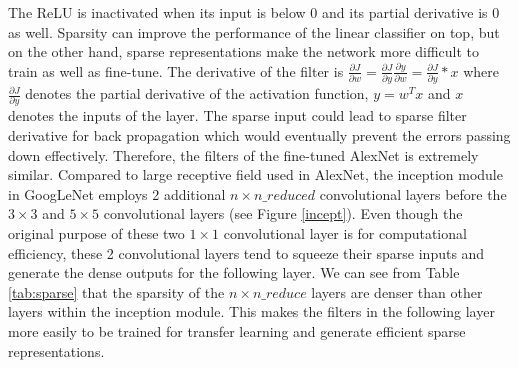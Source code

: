 The ReLU is inactivated when its input is below 0 and its partial derivative is 0 as well. Sparsity can improve the performance of the linear classifier on top, but on the other hand, sparse representations make the network more difficult to train as well as fine-tune. The derivative of the filter is $\frac{{\partial J}}{{\partial w}} = \frac{{\partial J}}{{\partial y}}\frac{{\partial y}}{{\partial w}} = \frac{{\partial J}}{{\partial y}}*x$ where $\frac{{\partial J}}{{\partial y}}$ denotes the partial derivative of the activation function, $y=w^Tx$ and $x$ denotes the inputs of the layer. The sparse input could lead to sparse filter derivative for back propagation which would eventually prevent the errors passing down effectively. Therefore, the filters of the fine-tuned AlexNet is extremely similar. Compared to large receptive field used in AlexNet, the inception module in GoogLeNet employs 2 additional $n\times n\_reduced$ convolutional layers before the $3\times 3$ and $5\times 5$ convolutional layers (see Figure \ref{incept}). Even though the original purpose of these two $1\times 1$ convolutional layer is for computational efficiency, these 2 convolutional layers tend to squeeze their sparse inputs and generate the dense outputs for the following layer. We can see from Table \ref{tab:sparse} that the sparsity of the $n\times n\_reduce$ layers are denser than other layers within the inception module. This makes the filters in the following layer more easily to be trained for transfer learning and generate efficient sparse representations.


